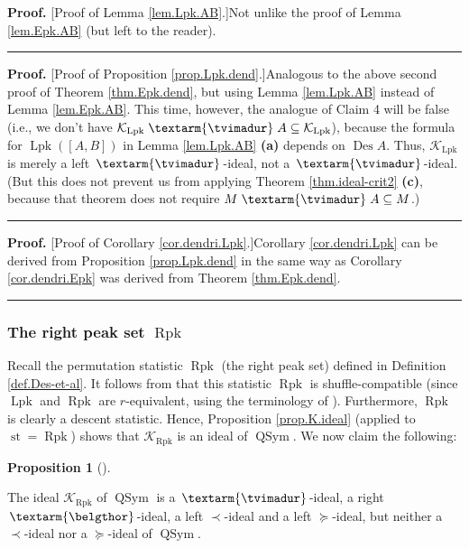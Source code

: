 \documentclass[numbers=enddot,12pt,final,onecolumn,notitlepage]{scrartcl}%
\theoremstyle{definition}
\newtheorem{prop}[theo]{Proposition}
\newenvironment{proposition}[1][]
{\begin{prop}[#1]\begin{leftbar}}
{\end{leftbar}\end{prop}}
\newenvironment{proof}[1][Proof]{\noindent\textbf{#1.} }{\ \rule{0.5em}{0.5em}}
\newenvironment{verlong}{}{}
\newcommand{\tvi}{\left. \textarm{\tvimadur} \right.}
\newcommand{\bel}{\left. \textarm{\belgthor} \right.}
\begin{document}
\begin{verlong}
\begin{proof}
[Proof of Lemma \ref{lem.Lpk.AB}.]Not unlike the proof of Lemma
\ref{lem.Epk.AB} (but left to the reader).
\end{proof}

\begin{proof}
[Proof of Proposition \ref{prop.Lpk.dend}.]Analogous to the above second proof
of Theorem \ref{thm.Epk.dend}, but using Lemma \ref{lem.Lpk.AB} instead of
Lemma \ref{lem.Epk.AB}. This time, however, the analogue of Claim 4 will be
false (i.e., we don't have $\mathcal{K}_{\operatorname*{Lpk}}\tvi
A\subseteq\mathcal{K}_{\operatorname*{Lpk}}$), because the formula for
$\operatorname*{Lpk}\left(  \left[  A,B\right]  \right)  $ in Lemma
\ref{lem.Lpk.AB} \textbf{(a)} depends on $\operatorname*{Des}A$. Thus,
$\mathcal{K}_{\operatorname*{Lpk}}$ is merely a left $\tvi$-ideal, not a
$\tvi$-ideal. (But this does not prevent us from applying Theorem
\ref{thm.ideal-crit2} \textbf{(c)}, because that theorem does not require
$M\tvi A\subseteq M$.)
\end{proof}

\begin{proof}
[Proof of Corollary \ref{cor.dendri.Lpk}.]Corollary \ref{cor.dendri.Lpk} can
be derived from Proposition \ref{prop.Lpk.dend} in the same way as Corollary
\ref{cor.dendri.Epk} was derived from Theorem \ref{thm.Epk.dend}.
\end{proof}

\subsubsection{The right peak set $\operatorname*{Rpk}$}

Recall the permutation statistic $\operatorname*{Rpk}$ (the right peak set)
defined in Definition \ref{def.Des-et-al}. It follows from \cite[Theorem 4.9
\textbf{(a)} and Theorem 3.5]{part1} that this statistic $\operatorname*{Rpk}$
is shuffle-compatible (since $\operatorname{Lpk}$ and $\operatorname{Rpk}$ are
$r$-equivalent, using the terminology of \cite{part1}). Furthermore,
$\operatorname*{Rpk}$ is clearly a descent statistic. Hence, Proposition
\ref{prop.K.ideal} (applied to $\operatorname*{st}=\operatorname*{Rpk}$) shows
that $\mathcal{K}_{\operatorname*{Rpk}}$ is an ideal of $\operatorname*{QSym}%
$. We now claim the following:

\begin{proposition}
\label{prop.Rpk.dend}The ideal $\mathcal{K}_{\operatorname*{Rpk}}$ of
$\operatorname*{QSym}$ is a $\tvi$-ideal, a right $\bel$-ideal, a left
$\left.  \prec\right.  $-ideal and a left $\left.  \succeq\right.  $-ideal,
but neither a $\left.  \prec\right.  $-ideal nor a $\left.  \succeq\right.
$-ideal of $\operatorname*{QSym}$.
\end{proposition}


\end{verlong}
\end{document}
